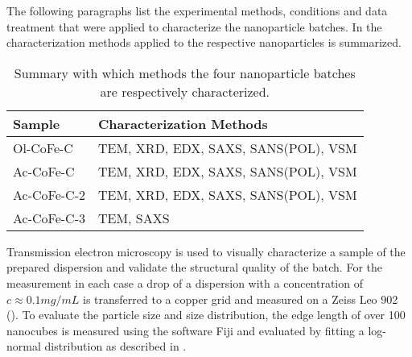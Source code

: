 \documentclass[\main/dresen_thesis.tex]{subfiles}
\begin{document}
  \label{sec:monolayers:nanoparticle:structuralCharacterization}
  The following paragraphs list the experimental methods, conditions and data treatment that were applied to characterize the nanoparticle batches.
  In  the characterization methods applied to the respective nanoparticles is summarized.

  \begin{table}[!htbp]
    \centering
    \caption{\label{tab:monolayers:nanoparticles:charMethod:overview}Summary with which methods the four nanoparticle batches are respectively characterized.}
    \begin{tabular}{ l | l }
      \textbf{Sample} & \textbf{Characterization Methods}\\
      \hline
      Ol-CoFe-C   & TEM, XRD, EDX, SAXS, SANS(POL), VSM \\
      Ac-CoFe-C   & TEM, XRD, EDX, SAXS, SANS(POL), VSM \\
      Ac-CoFe-C-2 & TEM, XRD, EDX, SAXS, SANS(POL), VSM \\
      Ac-CoFe-C-3 & TEM, SAXS \\
      \hline
    \end{tabular}
  \end{table}

    Transmission electron microscopy is used to visually characterize a sample of the prepared dispersion and validate the structural quality of the batch.
    For the measurement in each case a drop of a dispersion with a concentration of $c \approx 0.1 \unit{mg/mL}$ is transferred to a copper grid and measured on a Zeiss Leo 902 ().
    To evaluate the particle size and size distribution, the edge length of over 100 nanocubes is measured using the software Fiji \cite{Schindelin_2012_Fijia} and evaluated by fitting a log-normal distribution as described in .
\end{document}
